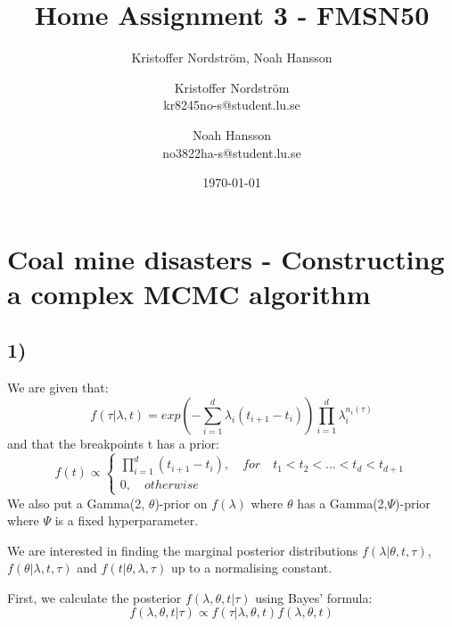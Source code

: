 \documentclass[a4paper]{article}
\title{Home Assignment 3 - FMSN50}
\author{Kristoffer Nordström, Noah Hansson}\author{Kristoffer Nordström \\ kr8245no-s@student.lu.se \and  Noah Hansson \\ no3822ha-s@student.lu.se}
\date{\today}
\begin{document}
\maketitle
\newpage

\section*{Coal mine disasters - Constructing a complex MCMC algorithm}

\subsection*{1)}
We are given that:
\begin{equation}
    \label{eq:interior}
    f(\tau | \lambda, t) = exp(-\sum_{i=1}^d\lambda_i(t_{i+1}-t_i))\prod_{i=1}^d\lambda_i^{n_i(\tau)}
\end{equation}
and that the breakpoints t has a prior:
\begin{equation}
    \label{eq:t_prior}
    f(t) \propto 
    \begin{cases}
    \prod_{i=1}^d(t_{i+1}-t_i), \quad for \quad t_1 < t_2 < ... < t_d < t_{d+1} \\
    0, \quad otherwise
    \end{cases}
\end{equation}
We also put a Gamma(2, $\theta$)-prior on $f(\lambda)$ where $\theta$ has a Gamma(2,$\Psi$)-prior where $\Psi$ is a fixed hyperparameter.

We are interested in finding the marginal posterior distributions $f(\lambda|\theta, t, \tau)$, $f(\theta | \lambda, t, \tau)$ and $f(t |\theta, \lambda, \tau)$ up to a normalising constant.

First, we calculate the posterior $f(\lambda, \theta, t | \tau)$ using Bayes' formula:
\begin{equation}
    f(\lambda, \theta, t | \tau) \propto f(\tau | \lambda, \theta, t)f(\lambda, \theta, t)
\end{equation}
\end{document}
